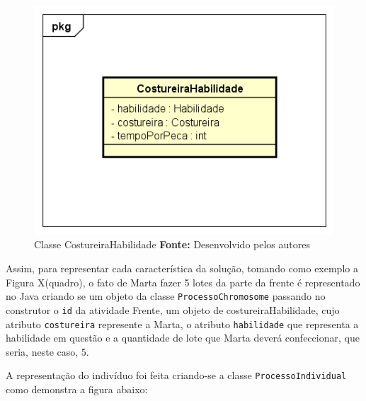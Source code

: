 \begin{figure}[h!]
	\centerline{\includegraphics[scale=0.9]{./imagens/costureiraHabilidade_class.png}}
	\caption[Classe CostureiraHabilidade]
	{Classe CostureiraHabilidade \textbf{Fonte:} Desenvolvido pelos autores}
	\label{fig:exemplo1}
\end{figure}


 \par Assim, para representar cada característica da solução, tomando como exemplo a Figura X(quadro), 
o fato de Marta fazer 5 lotes da parte da frente é representado no Java criando se um objeto da classe \texttt{ProcessoChromosome}
passando no construtor o \texttt{id} da atividade Frente, um objeto de costureiraHabilidade, cujo atributo \texttt{costureira} represente
a Marta, o atributo \texttt{habilidade} que representa a habilidade em questão e a quantidade de lote que Marta deverá confeccionar, que seria, neste caso, 5.

\par A representação do indivíduo foi feita criando-se a classe \texttt{ProcessoIndividual} como demonstra a figura abaixo:


